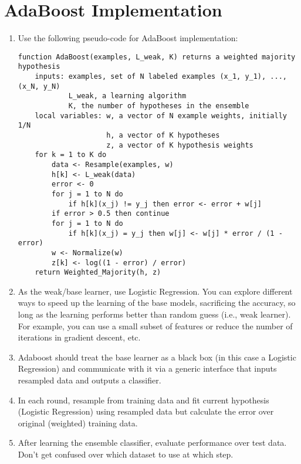 \documentclass[11pt, a4paper]{article}
\begin{document}
\section{AdaBoost Implementation}
\begin{enumerate}
    \item Use the following pseudo-code for AdaBoost implementation:
    \begin{lstlisting}
function AdaBoost(examples, L_weak, K) returns a weighted majority hypothesis
    inputs: examples, set of N labeled examples (x_1, y_1), ..., (x_N, y_N)
            L_weak, a learning algorithm
            K, the number of hypotheses in the ensemble
    local variables: w, a vector of N example weights, initially 1/N
                     h, a vector of K hypotheses
                     z, a vector of K hypothesis weights
    for k = 1 to K do
        data <- Resample(examples, w)
        h[k] <- L_weak(data)
        error <- 0
        for j = 1 to N do
            if h[k](x_j) != y_j then error <- error + w[j]
        if error > 0.5 then continue
        for j = 1 to N do
            if h[k](x_j) = y_j then w[j] <- w[j] * error / (1 - error)
        w <- Normalize(w)
        z[k] <- log((1 - error) / error)
    return Weighted_Majority(h, z)
    \end{lstlisting}
    \item As the weak/base learner, use Logistic Regression. You can explore different ways to speed up the learning of the base models, sacrificing the accuracy, so long as the learning performs better than random guess (i.e., weak learner). For example, you can use a small subset of features or reduce the number of iterations in gradient descent, etc.
    \item Adaboost should treat the base learner as a black box (in this case a Logistic Regression) and communicate with it via a generic interface that inputs resampled data and outputs a classifier.
    \item In each round, resample from training data and fit current hypothesis (Logistic Regression) using resampled data but calculate the error over original (weighted) training data.
    \item After learning the ensemble classifier, evaluate performance over test data. Don't get confused over which dataset to use at which step.
\end{enumerate}

\end{document}
